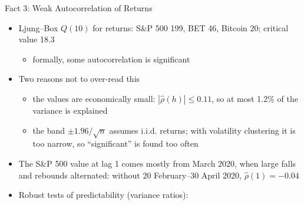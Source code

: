 \begin{frame}{Fact 3: Weak Autocorrelation of Returns}
\itemsize{\small}
\begin{itemize}
    \item Ljung--Box $Q(10)$ for returns: S\&P 500 199, BET 46, Bitcoin 20; critical value 18.3
    \begin{itemize}
        \item formally, some autocorrelation is significant
    \end{itemize}
    \item Two reasons not to over-read this
    \begin{itemize}
        \item the values are economically small: $|\hat\rho(h)| \le 0.11$, so at most 1.2\% of the variance is explained
        \item the band $\pm 1.96/\sqrt{n}$ assumes i.i.d. returns; with volatility clustering it is too narrow, so ``significant'' is found too often
    \end{itemize}
    \item The S\&P 500 value at lag 1 comes mostly from March 2020, when large falls and rebounds alternated: without 20 February--30 April 2020, $\hat\rho(1) = -0.04$
    \item Robust tests of predictability (variance ratios): 
\end{itemize}
\end{frame}

